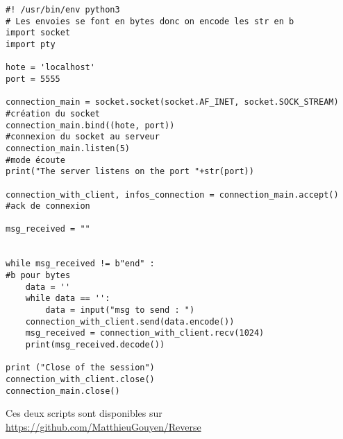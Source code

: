 \begin{center}
\begin{adjustbox}{center,caption={Code serveur},label={Code serveur},nofloat=figure}

\setlstipython
\begin{lstlisting}
#! /usr/bin/env python3
# Les envoies se font en bytes donc on encode les str en b
import socket
import pty

hote = 'localhost'
port = 5555

connection_main = socket.socket(socket.AF_INET, socket.SOCK_STREAM)		#création du socket
connection_main.bind((hote, port))										#connexion du socket au serveur
connection_main.listen(5)												#mode écoute
print("The server listens on the port "+str(port))

connection_with_client, infos_connection = connection_main.accept()		#ack de connexion

msg_received = ""


while msg_received != b"end" : 											#b pour bytes
	data = ''
	while data == '':
		data = input("msg to send : ")
	connection_with_client.send(data.encode())
	msg_received = connection_with_client.recv(1024)
	print(msg_received.decode())

print ("Close of the session")
connection_with_client.close()
connection_main.close()
\end{lstlisting}
\end{adjustbox}
\end{center}

Ces deux scripts sont disponibles sur \url{https://github.com/MatthieuGouyen/Reverse}
